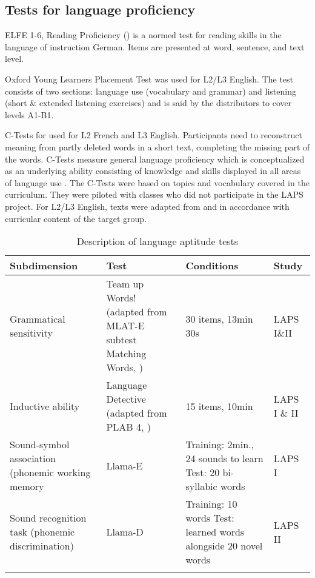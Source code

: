 \documentclass[output=paper]{langsci/langscibook}
\begin{document}
\subsection{Tests for language proficiency}
ELFE 1-6, Reading Proficiency (\citealt{LenhardSchneider2006}) is a normed test for reading skills in the language of instruction German. Items are presented at word, sentence, and text level.

Oxford Young Learners Placement Test \citep{Testing2013} was used for L2/L3 English. The test consists of two sections: language use (vocabulary and grammar) and listening (short \& extended listening exercises) and is said by the distributors to cover levels A1-B1.

C-Tests for used for L2 French and L3 English. Participants need to reconstruct meaning from partly deleted words in a short text, completing the missing part of the words. C-Tests measure general language proficiency which is conceptualized as an underlying ability consisting of knowledge and skills displayed in all areas of language use \citep{EckesGrotjahn2006}. The C-Tests were based on topics and vocabulary covered in the curriculum. They were piloted with classes who did not participate in the LAPS project. For L2/L3 English, texts were adapted from \citet{BabaiiShahri2010} and \citet{WildenPorsch2017} in accordance with curricular content of the target group.

\begin{table}[p]\footnotesize
\begin{tabularx}{\textwidth}{QQQl}
\lsptoprule
{Subdimension} & {Test} & {Conditions} & {Study}\\\midrule
Grammatical sensitivity & Team up Words! (adapted from MLAT-E subtest Matching Words, \citealt{CarrollSapon2010}) & 30 items, 13min 30s & LAPS I\&II\\
Inductive ability & Language Detective (adapted from PLAB 4, \citealt{PimsleurEtAl2004}) & 15 items, 10min & LAPS I \& II\\
Sound-symbol association (phonemic working memory & Llama-E \citep{MearaEtAl2001} & Training: 2min., 24 sounds to learn Test: 20 bi-syllabic words & LAPS I\\
Sound recognition task (phonemic discrimination) & Llama-D \citep{MearaEtAl2001} & Training: 10 words Test: learned words alongside 20 novel words & LAPS II\\
\lspbottomrule
\end{tabularx}
\caption{Description of language aptitude tests\label{tab:tests:part-1}}
\end{table}
\end{document}
